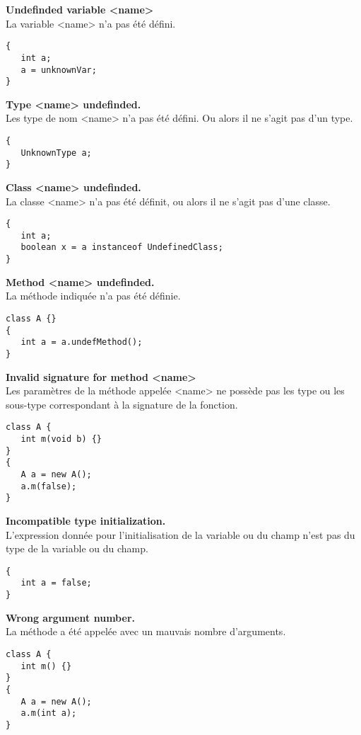 \documentclass[a4,12pt]{article}
\begin{document}
\textbf{Undefinded variable <name>}\\
La variable <name> n'a pas été défini.
\begin{lstlisting}
{
   int a;
   a = unknownVar;
}
\end{lstlisting}




\textbf{Type <name> undefinded.}\\
Les type de nom <name> n'a pas été défini. Ou alors il ne s'agit pas d'un type.
\begin{lstlisting}
{
   UnknownType a;
}
\end{lstlisting}




\textbf{Class <name> undefinded.}\\
La classe <name> n'a pas été définit, ou alors il ne s'agit pas d'une classe.
\begin{lstlisting}
{
   int a;
   boolean x = a instanceof UndefinedClass;
}
\end{lstlisting}




\textbf{Method <name> undefinded.}\\
La méthode indiquée n'a pas été définie.
\begin{lstlisting}
class A {}
{
   int a = a.undefMethod();
}
\end{lstlisting}




\textbf{Invalid signature for method <name>}\\
Les paramètres de la méthode appelée <name> ne possède pas les type ou les sous-type correspondant à la signature de la
fonction.
\begin{lstlisting}
class A {
   int m(void b) {}
}
{
   A a = new A();
   a.m(false);
}
\end{lstlisting}




\textbf{Incompatible type initialization.}\\
L'expression donnée pour l'initialisation de la variable ou du champ n'est pas du type de la variable ou du champ.
\begin{lstlisting}
{
   int a = false;
}
\end{lstlisting}




\textbf{Wrong argument number.}\\
La méthode a été appelée avec un mauvais nombre d'arguments.
\begin{lstlisting}
class A {
   int m() {}
}
{
   A a = new A();
   a.m(int a);
}
\end{lstlisting}
\end{document}
